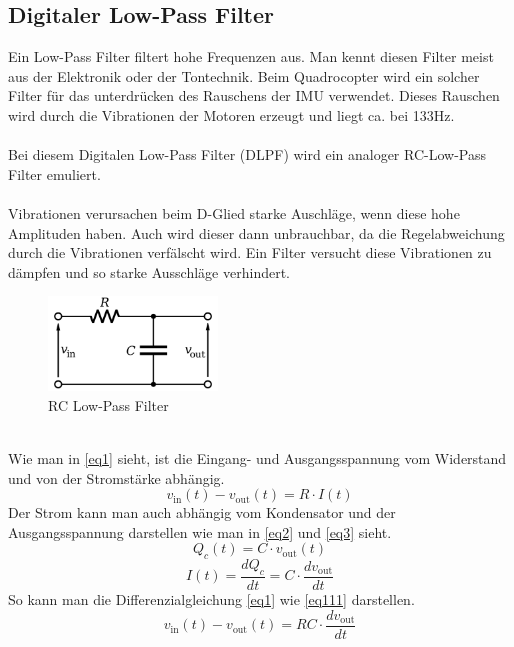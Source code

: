 \documentclass[12pt,a4paper, ngerman]{article}
\begin{document}
\subsection{Digitaler Low-Pass Filter}
Ein Low-Pass Filter filtert hohe Frequenzen aus. Man kennt diesen Filter meist aus der Elektronik oder der Tontechnik. Beim Quadrocopter wird ein solcher Filter für das unterdrücken des Rauschens der IMU verwendet. Dieses Rauschen wird durch die Vibrationen der Motoren erzeugt und liegt ca. bei 133Hz.\\ \\
Bei diesem Digitalen Low-Pass Filter (DLPF) wird ein analoger RC-Low-Pass Filter emuliert.\cite{website:Wikipedia_LPF}\\ \\
Vibrationen verursachen beim D-Glied starke Auschläge, wenn diese hohe Amplituden haben. Auch wird dieser dann unbrauchbar, da die Regelabweichung durch die Vibrationen verfälscht wird. Ein Filter versucht diese Vibrationen zu dämpfen und so starke Ausschläge verhindert.
\begin{figure}[h]
\centering
\includegraphics[width=0.4\textwidth]{DLPF1.png}
\caption[aasdf]{RC Low-Pass Filter}
\end{figure}\\
Wie man in \ref{eq1} sieht, ist die Eingang- und Ausgangsspannung vom Widerstand und von der Stromstärke abhängig.
\begin{equation} \label{eq1}
v_{\text{in}}(t)-v_{\text{out}}(t)=R\cdot I(t)
\end{equation}
Der Strom kann man auch abhängig vom Kondensator und der Ausgangsspannung darstellen wie man in \ref{eq2} und \ref{eq3} sieht.
\begin{equation} \label{eq2}
Q_{c}(t)=C\cdot v_{\text{out}}(t)
\end{equation}
\begin{equation} \label{eq3}
I(t)=\frac{dQ_{c}}{dt}=C\cdot \frac{dv_{\text{out}}}{dt}
\end{equation}
So kann man die Differenzialgleichung \ref{eq1} wie \ref{eq111} darstellen.\\
\begin{equation} \label{eq111}
v_{\text{in}}(t)-v_{\text{out}}(t)=RC\cdot \frac{dv_{\text{out}}}{dt}
\end{equation}
\end{document}
